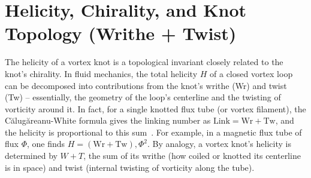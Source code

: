 \section*{Helicity, Chirality, and Knot Topology (Writhe + Twist)}

The helicity of a vortex knot is a topological invariant closely related to the knot's chirality. In fluid mechanics, the total helicity $H$ of a closed vortex loop can be decomposed into contributions from the knot's writhe (Wr) and twist (Tw) -- essentially, the geometry of the loop's centerline and the twisting of vorticity around it. In fact, for a single knotted flux tube (or vortex filament), the Călugăreanu-White formula gives the linking number as $\text{Link} = \text{Wr} + \text{Tw}$, and the helicity is proportional to this sum~\cite{knot_theroy_in_fluid}. For example, in a magnetic flux tube of flux $\Phi$, one finds $H = (\text{Wr} + \text{Tw}),\Phi^2$\cite{knot_theroy_in_fluid}. By analogy, a vortex knot's helicity is determined by $W+T$, the sum of its writhe (how coiled or knotted its centerline is in space) and twist (internal twisting of vorticity along the tube)\cite{knot_theroy_in_fluid}.

